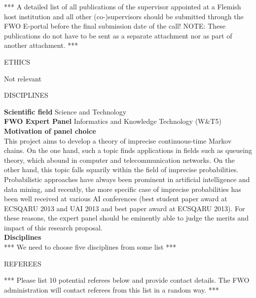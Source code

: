 \documentclass[11pt,dvipsnames,usenames,a4paper]{article}
\begin{document}
*** A detailed list of all publications of the supervisor appointed at a Flemish host institution and all other (co-)supervisors should be submitted through the FWO E-portal before the final submission date of the call!
NOTE: These publications do not have to be sent as a separate attachment nor as part of another attachment. ***

\vspace{5mm}

\begin{shaded}\centering ETHICS \end{shaded}

Not relevant

\vspace{5mm}

\begin{shaded}\centering DISCIPLINES \end{shaded}

{\bf Scientific field} \tab Science and Technology \\
{\bf FWO Expert Panel} \tab Informatics and Knowledge Technology (W\&T5) \\[8pt]
{\bf Motivation of panel choice}\\[6pt]
This project aims to develop a theory of imprecise continuous-time Markov chains. On the one hand, such a topic finds applications in fields such as queueing theory, which abound in computer and telecommunication networks. On the other hand, this topic falls squarily within the field of imprecise probabilities. Probabilistic approaches have always been prominent in artificial intelligence and data mining, and recently, the more specific case of imprecise probabilities has been well received at various AI conferences (best student paper award at ECSQARU 2013 and UAI 2013 and best paper award at ECSQARU 2013). For these reasons, the expert panel should be eminently able to judge the merits and impact of this research proposal.\\[8pt]
{\bf Disciplines}\\[6pt]
*** We need to choose five disciplines from some list ***


\vspace{5mm}

\begin{shaded}\centering REFEREES \end{shaded}


*** Please list 10 potential referees below and provide contact details.
The FWO administration will contact referees from this list in a random way. ***
\end{document}
